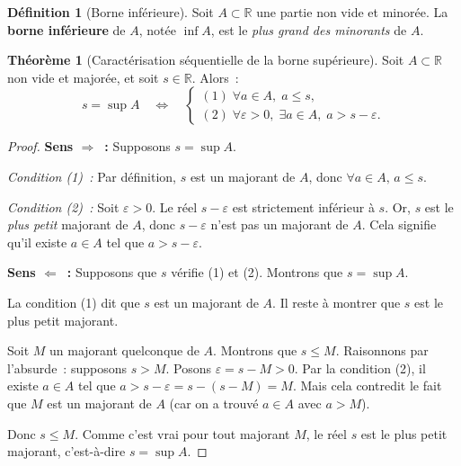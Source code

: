 \documentclass[12pt,a4paper,openany]{book}
\theoremstyle{definition}
\newtheorem{definition}{Définition}[chapter]
\newtheorem{theoreme}{Théorème}[chapter]
\newcommand{\R}{\mathbb{R}}
\newcommand{\eps}{\varepsilon}
\begin{document}
\begin{definition}[Borne inférieure]\label{def:borne-inf}
  Soit $A \subset \R$ une partie non vide et minorée. La \textbf{borne inférieure} de $A$, notée $\inf A$, est le \emph{plus grand des minorants} de $A$.
\end{definition}

\begin{theoreme}[Caractérisation séquentielle de la borne supérieure]\label{thm:caract-sup}
  Soit $A \subset \R$ non vide et majorée, et soit $s \in \R$. Alors~:
  \[
    s = \sup A \quad \Longleftrightarrow \quad
    \begin{cases}
      (1)\; \forall a \in A,\; a \leq s, \\[4pt]
      (2)\; \forall \eps > 0,\; \exists a \in A,\; a > s - \eps.
    \end{cases}
  \]
\end{theoreme}

\begin{proof}
  \textbf{Sens $\Rightarrow$~:} Supposons $s = \sup A$.

  \emph{Condition (1)~:} Par définition, $s$ est un majorant de $A$, donc $\forall a \in A,\, a \leq s$.

  \emph{Condition (2)~:} Soit $\eps > 0$. Le réel $s - \eps$ est strictement inférieur à $s$. Or, $s$ est le \emph{plus petit} majorant de $A$, donc $s - \eps$ n'est pas un majorant de $A$. Cela signifie qu'il existe $a \in A$ tel que $a > s - \eps$.

  \medskip
  \textbf{Sens $\Leftarrow$~:} Supposons que $s$ vérifie (1) et (2). Montrons que $s = \sup A$.

  La condition (1) dit que $s$ est un majorant de $A$. Il reste à montrer que $s$ est le plus petit majorant.

  Soit $M$ un majorant quelconque de $A$. Montrons que $s \leq M$. Raisonnons par l'absurde~: supposons $s > M$. Posons $\eps = s - M > 0$. Par la condition (2), il existe $a \in A$ tel que $a > s - \eps = s - (s - M) = M$. Mais cela contredit le fait que $M$ est un majorant de $A$ (car on a trouvé $a \in A$ avec $a > M$).

  Donc $s \leq M$. Comme c'est vrai pour tout majorant $M$, le réel $s$ est le plus petit majorant, c'est-à-dire $s = \sup A$.
\end{proof}
\end{document}
